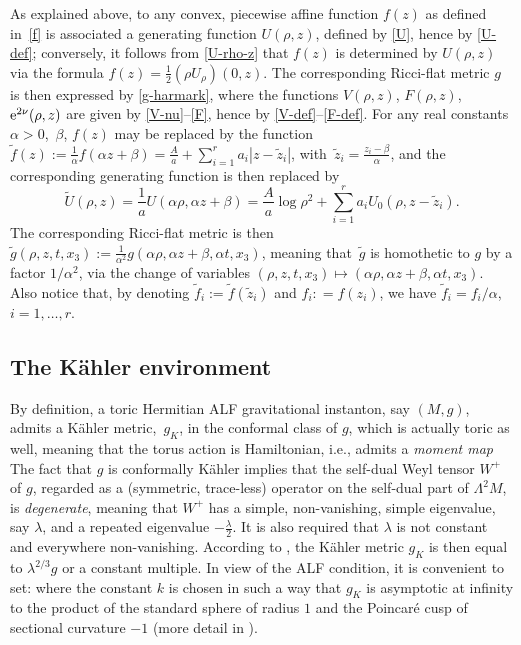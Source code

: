 \documentclass[pdftex]{sigma}
\numberwithin{equation}{section}
\begin{document}
\begin{rem} \label{rem-change} As explained above, to any convex, piecewise affine function $f (z)$ as defined in~\eqref{f} is associated a generating function $U (\rho, z)$, defined by \eqref{U}, hence by \eqref{U-def}; conversely, it follows from \eqref{U-rho-z} that $f (z)$ is determined by $U (\rho, z)$ via the formula $f (z) = \frac{1}{2} (\rho U_{\rho}) (0, z)$. The corresponding Ricci-flat metric $g$ is then expressed by \eqref{g-harmark}, where the functions $V (\rho, z)$, $F (\rho, z)$, ${\rm e}^{2 \nu} (\rho, z)$ are given by \eqref{V-nu}--\eqref{F}, hence by \eqref{V-def}--\eqref{F-def}. For any real constants $\alpha > 0$,~$\beta$, $f (z)$ may be replaced by the function $\tilde{f} (z) := \frac{1}{\alpha} f (\alpha z + \beta) = \frac{A}{a} + \sum _{i = 1}^r a _i |z - \tilde{z}_i|$, with~$\tilde{z}_i = \frac{z_i - \beta}{\alpha}$, and the corresponding generating function is then replaced by
\[\tilde{U} (\rho, z) = \frac{1}{a} U (\alpha \rho, \alpha z + \beta) = \frac{A}{a} \log{\rho ^2} + \sum _{i = 1} ^r a _i U_0 (\rho, z - \tilde{z} _i).\]
 The corresponding Ricci-flat metric is then $\tilde{g} (\rho, z, t, x_3) := \frac{1}{\alpha ^2} g (\alpha \rho, \alpha z + \beta, \alpha t, x _3)$, meaning that~$\tilde{g}$ is homothetic to $g$ by a factor $1/\alpha ^2$, via the change of variables $(\rho, z, t, x _3) \mapsto (\alpha \rho, \alpha z + \beta, \alpha t, x_3)$. Also notice that, by denoting $\tilde{f} _i := \tilde{f} (\tilde{z} _i)$ and $f_i : = f (z _i)$, we have
$\tilde{f} _i = f_i/\alpha$, $i = 1, \dots, r$. \end{rem}

\subsection{The K\"ahler environment} \label{sskaehler}
By definition, a toric Hermitian ALF gravitational instanton, say $(M, g)$, admits a K\"ahler metric,~$g _K$, in the conformal class of $g$, which is actually toric as well, meaning that the torus action is Hamiltonian, i.e., admits a {\it moment map} The fact that $g$ is conformally K\"ahler implies that the self-dual Weyl tensor $W ^+$ of $g$, regarded as a (symmetric, trace-less) operator on the self-dual part of $\Lambda ^2 M$, is {\it degenerate}, meaning that $W^+$ has a simple, non-vanishing, simple eigenvalue, say $\lambda$, and a repeated eigenvalue $- \frac{\lambda}{2}$. It is also required that $\lambda$ is not constant and everywhere non-vanishing. According to \cite{derdzinski}, the K\"ahler metric $g _K$ is then equal to $\lambda ^{2/3} g$ or a constant multiple. In view of the ALF condition, it is convenient to set:  where the constant $k$ is chosen in such a way that
$g_K$ is asymptotic at infinity to the product of the standard sphere of radius $1$ and the Poincar\'e cusp of sectional curvature $-1$ (more detail in \cite[Section~2]{BG}).
\end{document}
